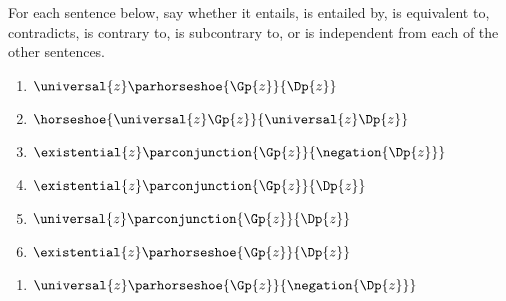  For each sentence below, say whether it entails, is entailed by, is equivalent to, contradicts, is contrary to, is subcontrary to, or is independent from each of the other sentences. 
\begin{multicols}{2}
\begin{enumerate}
\item {$\universal{\variable{z}}\parhorseshoe{\Gp{\variable{z}}}{\Dp{\variable{z}}}$}
\item {$\horseshoe{\universal{\variable{z}}\Gp{\variable{z}}}{\universal{\variable{z}}\Dp{\variable{z}}}$}
\item {$\existential{\variable{z}}\parconjunction{\Gp{\variable{z}}}{\negation{\Dp{\variable{z}}}}$}
\item {$\existential{\variable{z}}\parconjunction{\Gp{\variable{z}}}{\Dp{\variable{z}}}$}
\item {$\universal{\variable{z}}\parconjunction{\Gp{\variable{z}}}{\Dp{\variable{z}}}$}
\item {$\existential{\variable{z}}\parhorseshoe{\Gp{\variable{z}}}{\Dp{\variable{z}}}$}
\end{enumerate}
\end{multicols}
\begin{enumerate}[start=7] 
\item {$\universal{\variable{z}}\parhorseshoe{\Gp{\variable{z}}}{\negation{\Dp{\variable{z}}}}$}
\end{enumerate}




